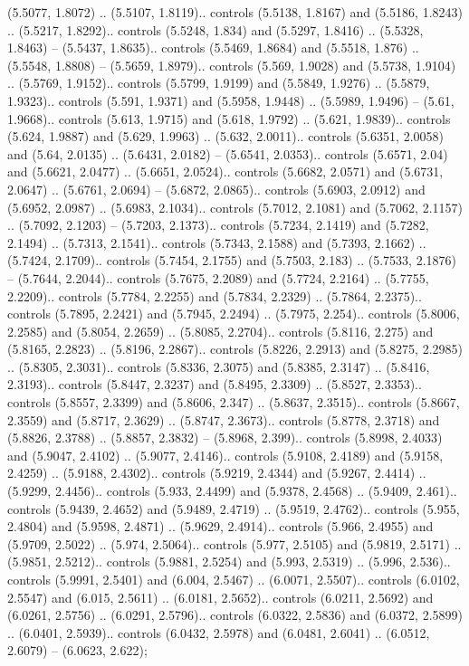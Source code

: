 (5.5077, 1.8072) .. (5.5107, 1.8119).. controls (5.5138, 1.8167) and (5.5186, 1.8243) .. (5.5217, 1.8292).. controls (5.5248, 1.834) and (5.5297, 1.8416) .. (5.5328, 1.8463) -- (5.5437, 1.8635).. controls (5.5469, 1.8684) and (5.5518, 1.876) .. (5.5548, 1.8808) -- (5.5659, 1.8979).. controls (5.569, 1.9028) and (5.5738, 1.9104) .. (5.5769, 1.9152).. controls (5.5799, 1.9199) and (5.5849, 1.9276) .. (5.5879, 1.9323).. controls (5.591, 1.9371) and (5.5958, 1.9448) .. (5.5989, 1.9496) -- (5.61, 1.9668).. controls (5.613, 1.9715) and (5.618, 1.9792) .. (5.621, 1.9839).. controls (5.624, 1.9887) and (5.629, 1.9963) .. (5.632, 2.0011).. controls (5.6351, 2.0058) and (5.64, 2.0135) .. (5.6431, 2.0182) -- (5.6541, 2.0353).. controls (5.6571, 2.04) and (5.6621, 2.0477) .. (5.6651, 2.0524).. controls (5.6682, 2.0571) and (5.6731, 2.0647) .. (5.6761, 2.0694) -- (5.6872, 2.0865).. controls (5.6903, 2.0912) and (5.6952, 2.0987) .. (5.6983, 2.1034).. controls (5.7012, 2.1081) and (5.7062, 2.1157) .. (5.7092, 2.1203) -- (5.7203, 2.1373).. controls (5.7234, 2.1419) and (5.7282, 2.1494) .. (5.7313, 2.1541).. controls (5.7343, 2.1588) and (5.7393, 2.1662) .. (5.7424, 2.1709).. controls (5.7454, 2.1755) and (5.7503, 2.183) .. (5.7533, 2.1876) -- (5.7644, 2.2044).. controls (5.7675, 2.2089) and (5.7724, 2.2164) .. (5.7755, 2.2209).. controls (5.7784, 2.2255) and (5.7834, 2.2329) .. (5.7864, 2.2375).. controls (5.7895, 2.2421) and (5.7945, 2.2494) .. (5.7975, 2.254).. controls (5.8006, 2.2585) and (5.8054, 2.2659) .. (5.8085, 2.2704).. controls (5.8116, 2.275) and (5.8165, 2.2823) .. (5.8196, 2.2867).. controls (5.8226, 2.2913) and (5.8275, 2.2985) .. (5.8305, 2.3031).. controls (5.8336, 2.3075) and (5.8385, 2.3147) .. (5.8416, 2.3193).. controls (5.8447, 2.3237) and (5.8495, 2.3309) .. (5.8527, 2.3353).. controls (5.8557, 2.3399) and (5.8606, 2.347) .. (5.8637, 2.3515).. controls (5.8667, 2.3559) and (5.8717, 2.3629) .. (5.8747, 2.3673).. controls (5.8778, 2.3718) and (5.8826, 2.3788) .. (5.8857, 2.3832) -- (5.8968, 2.399).. controls (5.8998, 2.4033) and (5.9047, 2.4102) .. (5.9077, 2.4146).. controls (5.9108, 2.4189) and (5.9158, 2.4259) .. (5.9188, 2.4302).. controls (5.9219, 2.4344) and (5.9267, 2.4414) .. (5.9299, 2.4456).. controls (5.933, 2.4499) and (5.9378, 2.4568) .. (5.9409, 2.461).. controls (5.9439, 2.4652) and (5.9489, 2.4719) .. (5.9519, 2.4762).. controls (5.955, 2.4804) and (5.9598, 2.4871) .. (5.9629, 2.4914).. controls (5.966, 2.4955) and (5.9709, 2.5022) .. (5.974, 2.5064).. controls (5.977, 2.5105) and (5.9819, 2.5171) .. (5.9851, 2.5212).. controls (5.9881, 2.5254) and (5.993, 2.5319) .. (5.996, 2.536).. controls (5.9991, 2.5401) and (6.004, 2.5467) .. (6.0071, 2.5507).. controls (6.0102, 2.5547) and (6.015, 2.5611) .. (6.0181, 2.5652).. controls (6.0211, 2.5692) and (6.0261, 2.5756) .. (6.0291, 2.5796).. controls (6.0322, 2.5836) and (6.0372, 2.5899) .. (6.0401, 2.5939).. controls (6.0432, 2.5978) and (6.0481, 2.6041) .. (6.0512, 2.6079) -- (6.0623, 2.622);



